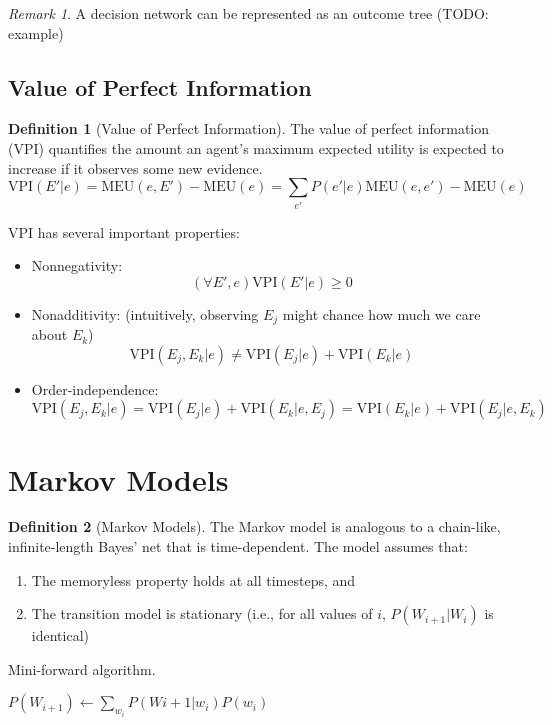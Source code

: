 \documentclass[11pt]{article}
\theoremstyle{definition}
\newtheorem{definition}{Definition}[section]
\theoremstyle{remark}
\newtheorem*{remark}{Remark}
\begin{document}
\begin{remark}
A decision network can be represented as an outcome tree (TODO: example)
\end{remark}

\subsection{Value of Perfect Information}
\begin{definition}[Value of Perfect Information]
The value of perfect information (VPI) quantifies the amount an agent's maximum expected utility is expected to increase if it observes some new evidence.
\[
\mathrm{VPI}(E'|e) = \mathrm{MEU}(e,E') - \mathrm{MEU}(e) = \sum_{e'} P(e' | e) \mathrm{MEU}(e,e') - \mathrm{MEU}(e)
\]

VPI has several important properties:
\begin{itemize}
\item Nonnegativity:
\[
(\forall E', e) \mathrm{VPI}(E'|e) \geq 0
\]
\item Nonadditivity: (intuitively, observing $E_j$ might chance how much we care about $E_k$)
\[
\mathrm{VPI}(E_j, E_k | e) \neq \mathrm{VPI}(E_j | e) + \mathrm{VPI}(E_k | e)
\]
\item Order-independence: 
\[
\mathrm{VPI}(E_j,E_k|e) = \mathrm{VPI}(E_j|e)+\mathrm{VPI}(E_k|e,E_j) = \mathrm{VPI}(E_k|e)+\mathrm{VPI}(E_j|e,E_k)
\]
\end{itemize}
\end{definition}
\clearpage

\section{Markov Models}
\begin{definition}[Markov Models]
The Markov model is analogous to a chain-like, infinite-length Bayes' net that is time-dependent. The model assumes that:
\begin{enumerate}
\item The memoryless property holds at all timesteps, and
\item The transition model is stationary (i.e., for all values of $i$, $P(W_{i+1}|W_i)$ is identical)
\end{enumerate}
\end{definition}

\begin{algorithm}
    \caption{Mini-forward algorithm.}

    
    \DontPrintSemicolon
    $P(W_{i+1}) \gets \sum_{w_i} P(W{i+1}|w_i)P(w_i)$
\end{algorithm}
\end{document}
